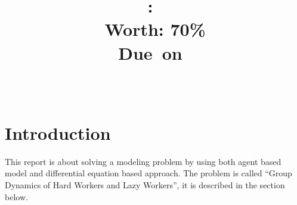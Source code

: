 \documentclass[a4paper, 12pt]{article}
\title{
\vspace{2.5in}
\textmd{\textbf{\hmwkClass:\ \hmwkTitle}}\\
\normalsize\vspace{0.1in}\small{Worth: 70\%}\\
\normalsize\vspace{0.1in}\small{Due\ on\ \hmwkDueDate}\\
\vspace{0.1in}\large{\textit{\hmwkClassInstructor\ }}\\
\vspace{2.5in}
}
\author{\hmwkGoupMemberI
}
\date{} %
\begin{document}
\maketitle
\thispagestyle{firststyle}



\newpage
\tableofcontents
\thispagestyle{empty}
\newpage
\clearpage
\setcounter{page}{1}
\section{Introduction}
This report is about solving a modeling problem by using both agent based model and differential equation based approach. The problem is called ``Group Dynamics of Hard Workers and Lazy Workers'', it is described in the section below.
\end{document}
